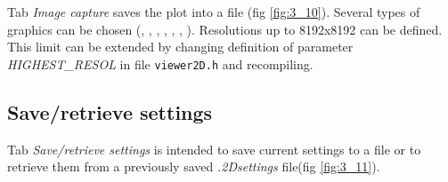 \documentclass[10pt]{article}
\begin{document}
Tab {\it Image capture} saves the
plot into a file (fig \ref{fig:3_10}). Several types of graphics can be chosen (\png{ }, 
\jpg, \bmp, \ppm, \tiff, \xbm, \xpm). Resolutions up to 8192x8192 can be defined.
This limit can be extended by changing definition of parameter {\it HIGHEST\_RESOL} in file \texttt{viewer2D.h} and recompiling. 

\subsection{Save/retrieve settings\label{sec:3.9}}

Tab {\it Save/retrieve settings} is intended
to save current settings to a file or to retrieve them from a previously
saved {\it .2Dsettings} file(fig \ref{fig:3_11}).
\end{document}
